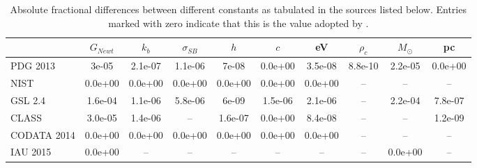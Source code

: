 \begin{table}
  \begin{center}
  \caption{Absolute fractional differences between different constants as tabulated in the sources listed below. Entries marked with zero indicate that this is the value adopted by \ccl. \label{tab:constants}}
  \begin{tabular}{lccccccccc}
\hline\hline
 & $G_{Newt}$ & $k_b$ & $\sigma_{SB}$ & $h$ & $c$ & eV & $\rho_c$ & $M_\odot$ & pc \\
\hline
PDG 2013 & 3e-05 & 2.1e-07 & 1.1e-06 & 7e-08 & 0.0e+00 & 3.5e-08 & 8.8e-10 & 2.2e-05 & 0.0e+00 \\[3pt]
NIST & 0.0e+00 & 0.0e+00 & 0.0e+00 & 0.0e+00 & 0.0e+00 & 0.0e+00 & \--- & \--- & \--- \\[3pt]
GSL 2.4 & 1.6e-04 & 1.1e-06 & 5.8e-06 & 6e-09 & 1.5e-06 & 2.1e-06 & \--- & 2.2e-04 & 7.8e-07 \\[3pt]
CLASS & 3.0e-05 & 1.4e-06 & \--- & 1.6e-07 & 0.0e+00 & 8.4e-08 & \--- & \--- & 1.2e-09 \\[3pt]
CODATA 2014 & 0.0e+00 & 0.0e+00 & 0.0e+00 & 0.0e+00 & 0.0e+00 & 0.0e+00 & \--- & \--- & \--- \\[3pt]
IAU 2015 & 0.0e+00 & \--- & \--- & \--- & \--- & \--- & \--- & 0.0e+00 & \--- \\
\hline\hline
\end{tabular}
\end{center}
\end{table}


